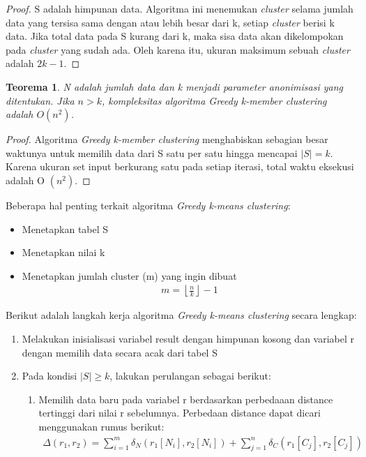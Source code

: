 \documentclass[a4paper,twoside]{article}
\newtheorem{theorem}{Teorema}
\begin{document}
\begin{enumerate}
\begin{proof}
S adalah himpunan data. Algoritma ini menemukan \textit{cluster} selama jumlah data yang tersisa sama dengan atau lebih besar dari k, setiap \textit{cluster} berisi k data. Jika total data pada S kurang dari k, maka sisa data akan dikelompokan pada  \textit{cluster} yang sudah ada. Oleh karena itu, ukuran maksimum sebuah \textit{cluster} adalah $2k-1$.
\end{proof}

\begin{theorem}
N adalah jumlah data dan k menjadi parameter anonimisasi yang ditentukan. Jika $n > k$, kompleksitas algoritma \textit{Greedy k-member clustering} adalah $O(n^2)$.
\end{theorem}

\begin{proof}
Algoritma \textit{Greedy k-member clustering} menghabiskan sebagian besar waktunya untuk memilih data dari S satu per satu hingga mencapai $|S| = k$. Karena ukuran set input berkurang satu pada setiap iterasi, total waktu eksekusi adalah O $(n^2)$.
\end{proof}

\noindent Beberapa hal penting terkait algoritma \textit{Greedy k-means clustering}:

\begin{itemize}
\item Menetapkan tabel S  
\item Menetapkan nilai k
\item Menetapkan jumlah cluster (m) yang ingin dibuat
\begin{align}
m = \left \lfloor \frac{n}{k} \right \rfloor - 1
\end{align}
\end{itemize}


\noindent Berikut adalah langkah kerja algoritma \textit{Greedy k-means clustering} secara lengkap:

\begin{enumerate}
\item Melakukan inisialisasi variabel result dengan himpunan kosong dan variabel r dengan memilih data secara acak dari tabel S

\item Pada kondisi $|S| \geq k$, lakukan perulangan sebagai berikut:

\begin{enumerate}
\item Memilih data baru pada variabel r berdasarkan perbedaaan distance tertinggi dari nilai r sebelumnya. Perbedaan distance dapat dicari menggunakan rumus berikut:
\begin{align*}
\Delta (r_1,r_2) = \sum_{i=1}^{m} \delta_N(r_1[N_i],r_2	[N_i]) +  \sum_{j=1}^{n} \delta_C(r_1[C_j],r_2[C_j])
\end{align*}


\end{enumerate}
\end{enumerate}
\end{enumerate}
\end{document}
